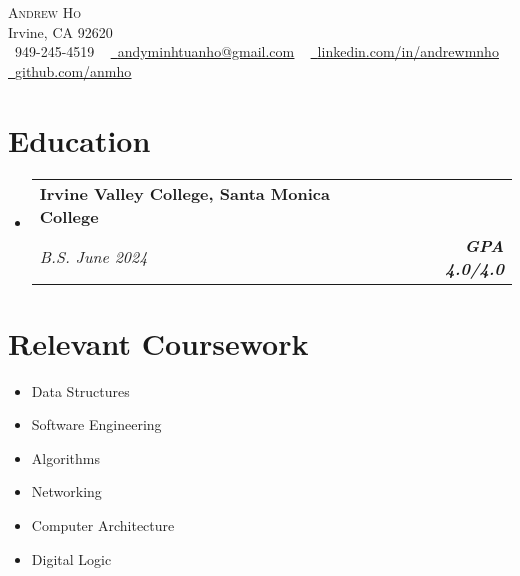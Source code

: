 \documentclass[letterpaper,11pt]{article}
\makeatletter
\newcommand{\resumeSubheading}[4]{
  \vspace{-2pt}\item
    \begin{tabular*}{1.0\textwidth}[t]{l@{\extracolsep{\fill}}r}
      \textbf{#1} & \textbf{\small #2} \\
      \textit{\small#3} & \textit{\small #4} \\
    \end{tabular*}\vspace{-7pt}
}
\newcommand{\resumeSubHeadingListStart}{\begin{itemize}[leftmargin=0.0in, label={}]}
\newcommand{\resumeSubHeadingListEnd}{\end{itemize}}
\makeatother
\begin{document}

\begin{center}
    {\Huge \scshape Andrew Ho} \\ \vspace{1pt}
    Irvine, CA 92620 \\ \vspace{1pt}
    \small \raisebox{-0.1\height}\faPhone\ 949-245-4519 ~ \href{mailto:andyminhtuanho@gmail.com}{\raisebox{-0.2\height}\faEnvelope\  \underline{andyminhtuanho@gmail.com}} ~
    \href{https://linkedin.com/in/andrewmnho/}{\raisebox{-0.2\height}\faLinkedin\ \underline{linkedin.com/in/andrewmnho}}  ~
    \href{https://github.com/}{\raisebox{-0.2\height}\faGithub\ \underline{github.com/anmho}}
    \vspace{-8pt}
\end{center}


\section{Education}
\resumeSubHeadingListStart
\resumeSubheading
{Irvine Valley College, Santa Monica College \normalfont{\small{}}}
{\normalfont{Computer Science}}
{B.S. June 2024} {\textbf{GPA 4.0/4.0}}
\resumeSubHeadingListEnd

\section{Relevant Coursework}
\begin{multicols}{4}
    \begin{itemize}[itemsep=-5pt, parsep=3pt]
        \item\small Data Structures
        \item Software Engineering
        \item Algorithms
        \item Networking
        \item Computer Architecture
        \item Digital Logic
    \end{itemize}
\end{multicols}
\vspace*{2.0\multicolsep}
\end{document}
